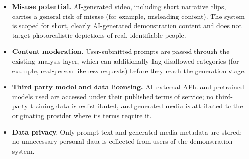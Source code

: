 \documentclass[11pt,a4paper]{article}
\begin{document}
\begin{itemize}[leftmargin=*]
\item \textbf{Misuse potential.} AI-generated video, including short narrative clips, carries a general risk of misuse (for example, misleading content). The system is scoped for short, clearly AI-generated demonstration content and does not target photorealistic depictions of real, identifiable people.
\item \textbf{Content moderation.} User-submitted prompts are passed through the existing analysis layer, which can additionally flag disallowed categories (for example, real-person likeness requests) before they reach the generation stage.
\item \textbf{Third-party model and data licensing.} All external APIs and pretrained models used are accessed under their published terms of service; no third-party training data is redistributed, and generated media is attributed to the originating provider where its terms require it.
\item \textbf{Data privacy.} Only prompt text and generated media metadata are stored; no unnecessary personal data is collected from users of the demonstration system.
\end{itemize}
\end{document}
